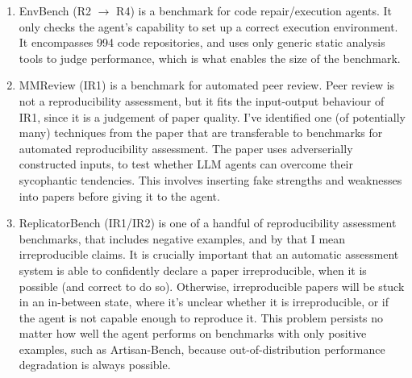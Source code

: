 \documentclass[8pt,a4paper]{article}
\begin{document}
\begin{enumerate}
        because the agent only has to answer questions about the pre-existing code output.
        The hard task conforms well to the R2 $\rightarrow$ R4 class, 
        if the question-answering is merely viewed as the judgement mechanism for how well the agent executed the code.
        The medium task also conforms to R2 $\rightarrow$ R4, but is easier, because the agent is handed a Dockerfile.
        I have not classified CORE-Bench\cite{corebench} as a reproducibility assessment benchmark\footnote{What I mean by this, 
        is a benchmark that, for example, tests an OR2 system. Basically a benchmark of a benchmark for papers.},
        because none of the task questions I could see in the dataset\cite{corebenchgithub} on github
        asked the agent to assess whether any experiment was reproduced.
        The first task is close: "Report the average AUC score of Had using the CTGCN-C method on the UCI dataset."
        This question leaves the assessment for reproducibility to someone/something else.
    \item EnvBench\cite{envbench} (R2 $\rightarrow$ R4)
        \subitem is a benchmark for code repair/execution agents.
        It only checks the agent's capability to set up a correct execution environment.
        It encompasses 994 code repositories, 
        and uses only generic static analysis tools to judge performance,
        which is what enables the size of the benchmark.
    \item MMReview\cite{mmreview} (IR1)
        \subitem is a benchmark for automated peer review.
        Peer review is not a reproducibility assessment,
        but it fits the input-output behaviour of IR1,
        since it is a judgement of paper quality.
        I've identified one (of potentially many) techniques from the 
        paper that are transferable to benchmarks for automated reproducibility assessment.
        The paper uses adverserially constructed inputs, 
        to test whether LLM agents can overcome their sycophantic tendencies\cite{liu2025}.
        This involves inserting fake strengths and weaknesses into papers before giving it to the agent.
    \item ReplicatorBench\cite{replicatorbench}\label{itm:replicatorbenchdesc} (IR1/IR2)
        \subitem is one of a handful of reproducibility assessment benchmarks, 
        that includes negative examples, and by that I mean irreproducible claims.
        It is crucially important that an automatic assessment system is able to 
        confidently declare a paper irreproducible, when it is possible (and correct to do so).
        Otherwise, irreproducible papers will be stuck in an in-between state,
        where it's unclear whether it is irreproducible, 
        or if the agent is not capable enough to reproduce it.
        This problem persists no matter how well the agent performs on benchmarks with only positive examples, 
        such as Artisan-Bench\cite[pages~9--17]{artisan}, 
        because out-of-distribution performance degradation is always possible.


\end{enumerate}
\end{document}
